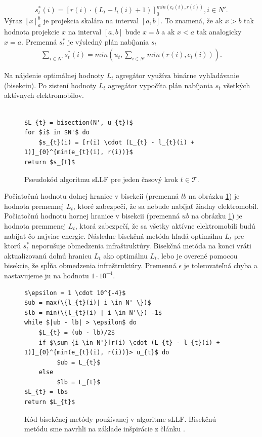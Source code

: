  \begin{equation}
     \label{sllf:eq5}
     s_{t}^{*}(i) = [r(i) \cdot (L_{t} - l_{t}(i) + 1)]_{0}^{min(e_{t}(i), r(i))}, i \in N'.
 \end{equation}
 Výraz $[x]_{a}^{b}$ je projekcia skalára na interval $[a,b]$. To znamená, že ak $x > b$ tak hodnota projekcie $x$ na interval $[a, b]$ bude $x = b$ a ak $x < a$ tak analogicky $x = a$.
Premenná $s_{t}^{*}$ je výsledný plán nabíjania $s_{t}$ 
 \begin{gather}
     \sum_{i \in N'} s_{t}^{*}(i) = min(u_{t}, \sum_{i \in N'} min(r(i), e_{t}(i))).
 \end{gather}
 
 Na nájdenie optimálnej hodnoty $L_{t}$ agregátor využíva binárne vyhľadávanie (bisekciu). Po zistení hodnoty $L_{t}$ agregátor vypočíta plán nabíjania $s_{t}$ všetkých aktívnych elektromobilov. 
 \begin{figure}[H]
 \begin{lstlisting}[mathescape=true]

$L_{t} = bisection(N', u_{t})$
for $i$ in $N'$ do
    $s_{t}(i) = [r(i) \cdot (L_{t} - l_{t}(i) + 1)]_{0}^{min(e_{t}(i), r(i))}$
return $s_{t}$
 \end{lstlisting}
 \caption[Pseudokód algoritmu sLLF pre jeden časový krok.]{Pseudokód algoritmu sLLF pre jeden časový krok $t \in \mathcal{T}$.}
\end{figure}

 

 Počiatočnú hodnotu dolnej hranice v bisekcii (premenná $lb$ na obrázku \ref{sllf:bisection}) je hodnota premennej $L_{t}$, ktoré zabezpečí, že sa nebude nabíjať žiadny elektromobil. Počiatočnú hodnotu hornej hranice v bisekcii (premenná $ub$ na obrázku \ref{sllf:bisection}) je hodnota premmenej $L_{t}$, ktorá zabezpečí, že sa všetky aktívne elektromobili budú nabíjať čo najviac energie. Následne bisekčná metóda hľadá optimálnu $L_{t}$ pre ktorú $s_{t}^{*}$ neporušuje obmedzenia infraštruktúry. Bisekčná metóda na konci vráti aktualizovanú dolnú hranicu $L_{t}$ ako optimálnu $L_{t}$, lebo je overené pomocou bisekcie, že spĺňa obmedzenia infraštruktúry. Premenná $\epsilon$ je tolerovateľná chyba a nastavujeme ju na hodnotu $1 \cdot 10^{-4}$. 

 \begin{figure}[H]
 \begin{lstlisting}[mathescape=true]
$\epsilon = 1 \cdot 10^{-4}$
$ub = max(\{l_{t}(i)| i \in N' \})$
$lb = min(\{l_{t}(i) | i \in N'\}) -1$
while $|ub - lb| > \epsilon$ do
    $L_{t} = (ub - lb)/2$
    if $\sum_{i \in N'}[r(i) \cdot (L_{t} - l_{t}(i) + 1)]_{0}^{min(e_{t}(i), r(i))}> u_{t}$ do 
         $ub = L_{t}$
    else
         $lb = L_{t}$
$L_{t} = lb$
return $L_{t}$
 \end{lstlisting}
 \caption[Kód bisekčnej metódy používanej v algoritme sLLF.]{Kód bisekčnej metódy používanej v algoritme sLLF. Bisekčnú metódu sme navrhli na základe inšpirácie z článku \cite{Chen2014ElectricVCbisection}.}
 \label{sllf:bisection}
\end{figure}


